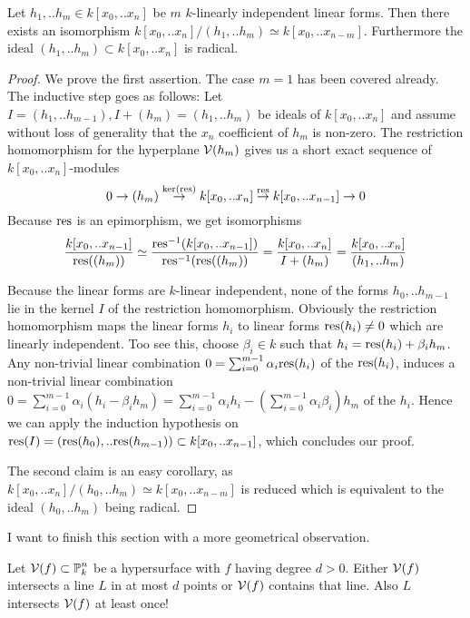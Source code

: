 \begin{corollary} \label{corollaryRadical}
Let $h_1,.. h_m \in k[x_0,..x_n]$ be $m$ $k$-linearly independent linear forms.
Then there exists an isomorphism $k[x_0,..x_n]/(h_1,..h_m) \simeq k[x_0,..x_{n-m}]$.
Furthermore the ideal $(h_1,..h_m)\subset k[x_0,..x_n]$ is radical.
\end{corollary}
\begin{proof}
We prove the first assertion.
The case $m=1$ has been covered already.
The inductive step goes as follows:
Let $I = (h_1,..h_{m-1}), I+(h_m) = (h_1,..h_m)$ be ideals of $k[x_0,..x_n]$ and assume without loss of generality that the $x_n$ coefficient of $h_m$ is non-zero.
The restriction homomorphism for the hyperplane $\operatorname{\mathcal V}(h_m)$ gives us a short exact sequence of $k[x_0,..x_n]$-modules
\begin{equation}
0 \to (h_m) \overset{\ker({\operatorname{res}})}\to k[x_0,..x_n] \overset{{\operatorname{res}}}\to k[x_0,..x_{n-1}] \to 0
\end{equation}
Because ${\operatorname{res}}$ is an epimorphism, we get isomorphisms
\begin{equation}
\frac{k[x_0,..x_{n-1}]}{{\operatorname{res}}((h_m))}
\simeq \frac{{\operatorname{res}}^{-1}(k[x_0,..x_{n-1}])}{{\operatorname{res}}^{-1}({\operatorname{res}}((h_m))}
= \frac{k[x_0,..x_n]}{I+(h_m)}
= \frac{k[x_0,..x_n]}{(h_1,..h_m)}
\end{equation}

Because the linear forms are $k$-linear independent, none of the forms $h_0,..h_{m-1}$ lie in the kernel $I$ of the restriction homomorphism.
Obviously the restriction homomorphism maps the linear forms $h_i$ to linear forms ${\operatorname{res}}(h_i) \neq 0$ which are linearly independent.
Too see this, choose $\beta_i \in k$ such that $h_i = {\operatorname{res}}(h_i) + \beta_i h_m$.
Any non-trivial linear combination $0 = \sum_{i=0}^{m-1} \alpha_i {\operatorname{res}}(h_i)$ of the ${\operatorname{res}}(h_i)$, induces a non-trivial linear combination $0 = \sum_{i=0}^{m-1} \alpha_i(h_i - \beta_i h_m) = \sum_{i=0}^{m-1}\alpha_i h_i - (\sum_{i=0}^{m-1} \alpha_i\beta_i)h_m$ of the $h_i$.
Hence we can apply the induction hypothesis on ${\operatorname{res}}(I) = ({\operatorname{res}}(h_0),..{\operatorname{res}}(h_{m-1})) \subset k[x_0,..x_{n-1}]$, which concludes our proof.


The second claim is an easy corollary, as $k[x_0,..x_n]/(h_0,..h_m) \simeq k[x_0,..x_{n-m}]$ is reduced which is equivalent to the ideal $(h_0,..h_m)$ being radical.

\end{proof}

I want to finish this section with a more geometrical observation.
\begin{proposition} \label{propositionDegreeOfSurface}
Let $\operatorname{\mathcal V}(f) \subset \operatorname{\mathbb P}^n_k$ be a hypersurface with $f$ having degree $d> 0$.
Either $\operatorname{\mathcal V}(f)$ intersects a line $L$ in at most $d$ points or $\operatorname{\mathcal V}(f)$ contains that line.
Also $L$ intersects $\operatorname{\mathcal V}(f)$ at least once!
\end{proposition}


